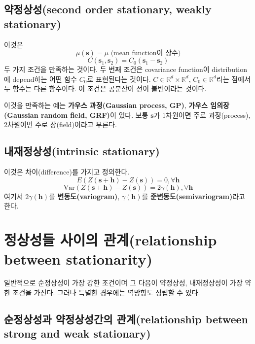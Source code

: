 \documentclass[b5paper,]{scrbook}
\theoremstyle{plain}
\theoremstyle{definition}
\numberwithin{equation}{section}
\begin{document}
\hypertarget{second-order-stationary-weakly-stationary}{%
\subsection{약정상성(second order stationary, weakly stationary)}\label{second-order-stationary-weakly-stationary}}

이것은
\[\mu(\mathbf{s})=\mu \text{ (mean function이 상수)}\]
\[C(\mathbf{s}_{1},\mathbf{s}_{2})=C_{0}(\mathbf{s}_{1}-\mathbf{s}_{2})\]
두 가지 조건을 만족하는 것이다. 두 번째 조건은 covariance function이 distribution에 depend하는 어떤 함수 \(C_{0}\)로 표현된다는 것이다. \(C \in \mathbb{R}^{d}\times \mathbb{R}^{d}\), \(C_{0} \in \mathbb{R}^{d}\)라는 점에서 두 함수는 다른 함수이다. 이 조건은 공분산이 전이 불변이라는 것이다.

이것을 만족하는 예는 \textbf{가우스 과정(Gaussian process, GP)}, \textbf{가우스 임의장(Gaussian random field, GRF)}이 있다. 보통 \(\mathbf{s}\)가 1차원이면 주로 과정(process), 2차원이면 주로 장(field)이라고 부른다.

\hypertarget{intrinsic-stationary}{%
\subsection{내재정상성(intrinsic stationary)}\label{intrinsic-stationary}}

이것은 차이(difference)를 가지고 정의한다.
\[E(Z(\mathbf{s}+\mathbf{h})-Z(\mathbf{s}))=0, \forall \mathbf{h}\]
\[\text{Var}(Z(\mathbf{s}+\mathbf{h})-Z(\mathbf{s}))=2\gamma(\mathbf{h}), \forall \mathbf{h}\]
여기서 \(2\gamma(\mathbf{h})\)를 \textbf{변동도(variogram)}, \(\gamma(\mathbf{h})\)를 \textbf{준변동도(semivariogram)}라고 한다.

\hypertarget{--relationship-between-stationarity}{%
\section{정상성들 사이의 관계(relationship between stationarity)}\label{--relationship-between-stationarity}}

일반적으로 순정상성이 가장 강한 조건이며 그 다음이 약정상성, 내재정상성이 가장 약한 조건을 가진다. 그러나 특별한 경우에는 역방향도 성립할 수 있다.

\hypertarget{--relationship-between-strong-and-weak-stationary}{%
\subsection{순정상성과 약정상성간의 관계(relationship between strong and weak stationary)}\label{--relationship-between-strong-and-weak-stationary}}
\end{document}
